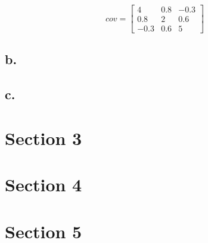 \documentclass{report}
\begin{document}
\[
  cov=
  \begin{bmatrix}
    4 & 0.8 & -0.3 \\
    0.8 & 2 & 0.6 \\
    -0.3 & 0.6 & 5
  \end{bmatrix}
\]

\section{b.}

\section{c.}

\chapter{Section 3}

\chapter{Section 4}

\chapter{Section 5}
\end{document}
